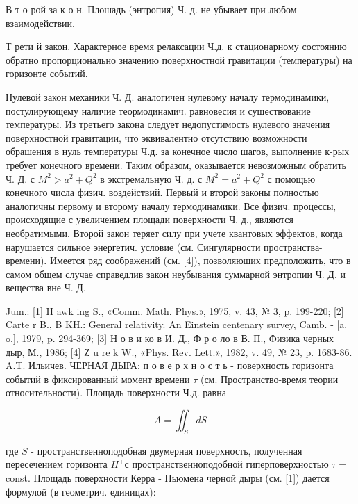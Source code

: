 \documentclass[10pt]{article}
\begin{document}
В т о рой за к о н. Плошадь (энтропия) Ч. д. не убывает при любом взаимодействии.



Т рети й закон. Характерное время релаксации Ч.д. к стационарному состоянию обратно пропорционально значению поверхностной гравитации (температуры) на горизонте событий.



Нулевой закон механики Ч. Д. аналогичен нулевому началу термодинамики, постулирующему наличие теормодинамич. равновесия и существование температуры. Из третьего закона следует недопустимость нулевого значения поверхностной гравитации, что эквивалентно отсутствию возможности обрашения в нуль температуры Ч.д. за конечное число шагов, выполнение к-рых требует конечного времени. Таким образом, оказывается невозможным обратить Ч. Д. с $M^{2}>a^{2}+Q^{2}$ в экстремальную Ч. д. с $M^{2}=a^{2}+Q^{2}$ с помощью конечного числа физич. воздействий. Первый и второй законы полностью аналогичны первому и второму началу термодинамики. Все физич. процессы, происходящие с увеличением площади поверхности Ч. д., являются необратимыми. Второй закон теряет силу при учете квантовых эффектов, когда нарушается сильное энергетич. условие (см. Сингулярности пространства-времени). Имеется ряд соображений (см. [4]), позволяюших предположить, что в самом общем случае справедлив закон неубывания суммарной энтропии Ч. Д. и вещества вне Ч. Д.



Jum.: [1] H awk ing S., «Comm. Math. Phys.», 1975, v. 43, № 3, p. 199-220; [2] Carte r B., B KH.: General relativity. An Einstein centenary survey, Camb. - [a. o.], 1979, p. 294-369; [3] Н о в и ко в И. Д., Ф р о ло в В. П., Физика черных дыр, М., 1986; [4] Z u re k W., «Phys. Rev. Lett.», 1982, v. 49, № 23, p. 1683-86. A.T. Ильичев. ЧЕРНАЯ ДЫРА; п о в е р х н о с т ь - поверхность горизонта событий в фиксированный момент времени $\tau$ (см. Пространство-время теории относительности). Площадь поверхности Ч.д. равна



\[

A=\iint_{S} d S

\]



где $S$ - пространственноподобная двумерная поверхность, полученная пересечением горизонта $H^{+}$с пространственноподобной гиперповерхностью $\tau=$ const. Площадь поверхности Керра - Ньюмена черной дыры (см. [1]) дается формулой (в геометрич. единицах):
\end{document}
